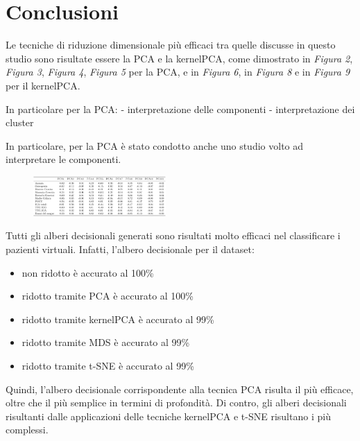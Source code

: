 \documentclass[11pt,a4paper,twocolumn]{article}
\begin{document}
\section{Conclusioni}
Le tecniche di riduzione dimensionale più efficaci tra quelle discusse in questo studio sono risultate essere la PCA e la kernelPCA, come dimostrato in \emph{Figura 2}, \emph{Figura 3}, \emph{Figura 4}, \emph{Figura 5} per la PCA, e in \emph{Figura 6}, in \emph{Figura 8} e in \emph{Figura 9} per il kernelPCA. \par

In particolare per la PCA:
- interpretazione delle componenti
- interpretazione dei cluster

In particolare, per la PCA è stato condotto anche uno studio volto ad interpretare le componenti.

\begin{figure}[H]
	\centering
	\includegraphics[width=0.45\textwidth]{img/PCA_components_interpretation.png}
	\caption{}
\end{figure}

Tutti gli alberi decisionali generati sono risultati molto efficaci nel classificare i pazienti virtuali. Infatti, l'albero decisionale per il dataset:
\begin{itemize}
	\item non ridotto è accurato al 100\%
	\item ridotto tramite PCA è accurato al 100\%
	\item ridotto tramite kernelPCA è accurato al 99\%
	\item ridotto tramite MDS è accurato al 99\%
	\item ridotto tramite t-SNE è accurato al 99\%
\end{itemize}
Quindi, l'albero decisionale corrispondente alla tecnica PCA risulta il più efficace, oltre che il più semplice in termini di profondità. Di contro, gli alberi decisionali risultanti dalle applicazioni delle tecniche kernelPCA e t-SNE risultano i più complessi.
\end{document}
